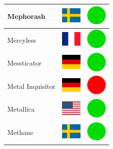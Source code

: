 \documentclass[12pt, a4paper, twoside]{report}
\begin{document}
\begin{center}
\begin{longtable}{|p{5cm}|p{2cm}|p{2cm}|}
 Mephorash                                                  & \includegraphics[width=1cm]{../img/flags/se} &   \includegraphics[width=1cm]{../likes/y} \\ \hline
 Mercyless                                                  & \includegraphics[width=1cm]{../img/flags/fr} &   \includegraphics[width=1cm]{../likes/y} \\ \hline
 Messticator                                                & \includegraphics[width=1cm]{../img/flags/de} &   \includegraphics[width=1cm]{../likes/y} \\ \hline
 Metal Inquisitor                                           & \includegraphics[width=1cm]{../img/flags/de} &   \includegraphics[width=1cm]{../likes/n} \\ \hline
 Metallica                                                  & \includegraphics[width=1cm]{../img/flags/us} &   \includegraphics[width=1cm]{../likes/y} \\ \hline
 Methane                                                    & \includegraphics[width=1cm]{../img/flags/se} &   \includegraphics[width=1cm]{../likes/y} \\ \hline

\end{longtable}
\end{center}
\end{document}
